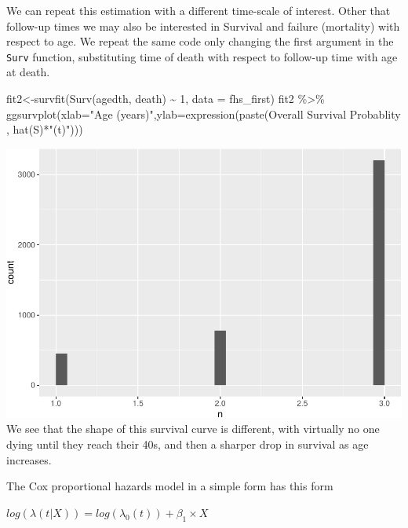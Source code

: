 \documentclass[
]{book}
\newenvironment{Shaded}{\begin{snugshade}}{\end{snugshade}}
\newcommand{\AttributeTok}[1]{\textcolor[rgb]{0.77,0.63,0.00}{#1}}
\newcommand{\DecValTok}[1]{\textcolor[rgb]{0.00,0.00,0.81}{#1}}
\newcommand{\FunctionTok}[1]{\textcolor[rgb]{0.00,0.00,0.00}{#1}}
\newcommand{\NormalTok}[1]{#1}
\newcommand{\OtherTok}[1]{\textcolor[rgb]{0.56,0.35,0.01}{#1}}
\newcommand{\SpecialCharTok}[1]{\textcolor[rgb]{0.00,0.00,0.00}{#1}}
\newcommand{\StringTok}[1]{\textcolor[rgb]{0.31,0.60,0.02}{#1}}
\begin{document}
We can repeat this estimation with a different time-scale of interest. Other that follow-up times we may also be interested in Survival and failure (mortality) with respect to age. We repeat the same code only changing the first argument in the \texttt{Surv} function, substituting time of death with respect to follow-up time with age at death.

\begin{Shaded}
\begin{Highlighting}[]
\NormalTok{fit2}\OtherTok{\textless{}{-}}\FunctionTok{survfit}\NormalTok{(}\FunctionTok{Surv}\NormalTok{(agedth, death) }\SpecialCharTok{\textasciitilde{}} \DecValTok{1}\NormalTok{, }\AttributeTok{data =}\NormalTok{ fhs\_first)}
\NormalTok{fit2 }\SpecialCharTok{\%\textgreater{}\%}
\FunctionTok{ggsurvplot}\NormalTok{(}\AttributeTok{xlab=}\StringTok{"Age (years)"}\NormalTok{,}\AttributeTok{ylab=}\FunctionTok{expression}\NormalTok{(}\FunctionTok{paste}\NormalTok{(}\StringTok{\textquotesingle{}Overall Survival Probablity \textquotesingle{}}\NormalTok{, }\FunctionTok{hat}\NormalTok{(S)}\SpecialCharTok{*}\StringTok{"(t)"}\NormalTok{)))}
\end{Highlighting}
\end{Shaded}

\includegraphics{adv_epi_analysis_files/figure-latex/unnamed-chunk-144-1.pdf}
We see that the shape of this survival curve is different, with virtually no one dying until they reach their 40s, and then a sharper drop in survival as age increases.

The Cox proportional hazards model in a simple form has this form

\(log(\lambda(t|X))=log(\lambda_{0}(t))+\beta_{1}\times X\)
\end{document}
